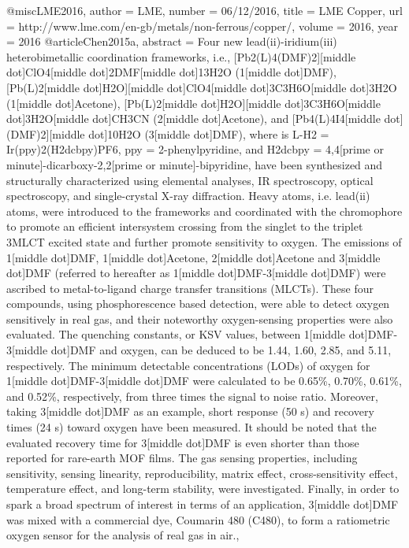 @misc{LME2016,
author = {LME},
number = {06/12/2016},
title = {{LME Copper}},
url = {http://www.lme.com/en-gb/metals/non-ferrous/copper/},
volume = {2016},
year = {2016}
}
@article{Chen2015a,
abstract = {Four new lead(ii)-iridium(iii) heterobimetallic coordination frameworks, i.e., [Pb2(L)4(DMF)2][middle dot]ClO4[middle dot]2DMF[middle dot]13H2O (1[middle dot]DMF), [Pb(L)2[middle dot]H2O][middle dot]ClO4[middle dot]3C3H6O[middle dot]3H2O (1[middle dot]Acetone), [Pb(L)2[middle dot]H2O][middle dot]3C3H6O[middle dot]3H2O[middle dot]CH3CN (2[middle dot]Acetone), and [Pb4(L)4I4[middle dot](DMF)2][middle dot]10H2O (3[middle dot]DMF), where is L-H2 = Ir(ppy)2(H2dcbpy)PF6, ppy = 2-phenylpyridine, and H2dcbpy = 4,4[prime or minute]-dicarboxy-2,2[prime or minute]-bipyridine, have been synthesized and structurally characterized using elemental analyses, IR spectroscopy, optical spectroscopy, and single-crystal X-ray diffraction. Heavy atoms, i.e. lead(ii) atoms, were introduced to the frameworks and coordinated with the chromophore to promote an efficient intersystem crossing from the singlet to the triplet 3MLCT excited state and further promote sensitivity to oxygen. The emissions of 1[middle dot]DMF, 1[middle dot]Acetone, 2[middle dot]Acetone and 3[middle dot]DMF (referred to hereafter as 1[middle dot]DMF-3[middle dot]DMF) were ascribed to metal-to-ligand charge transfer transitions (MLCTs). These four compounds, using phosphorescence based detection, were able to detect oxygen sensitively in real gas, and their noteworthy oxygen-sensing properties were also evaluated. The quenching constants, or KSV values, between 1[middle dot]DMF-3[middle dot]DMF and oxygen, can be deduced to be 1.44, 1.60, 2.85, and 5.11, respectively. The minimum detectable concentrations (LODs) of oxygen for 1[middle dot]DMF-3[middle dot]DMF were calculated to be 0.65{\%}, 0.70{\%}, 0.61{\%}, and 0.52{\%}, respectively, from three times the signal to noise ratio. Moreover, taking 3[middle dot]DMF as an example, short response (50 s) and recovery times (24 s) toward oxygen have been measured. It should be noted that the evaluated recovery time for 3[middle dot]DMF is even shorter than those reported for rare-earth MOF films. The gas sensing properties, including sensitivity, sensing linearity, reproducibility, matrix effect, cross-sensitivity effect, temperature effect, and long-term stability, were investigated. Finally, in order to spark a broad spectrum of interest in terms of an application, 3[middle dot]DMF was mixed with a commercial dye, Coumarin 480 (C480), to form a ratiometric oxygen sensor for the analysis of real gas in air.},
}
